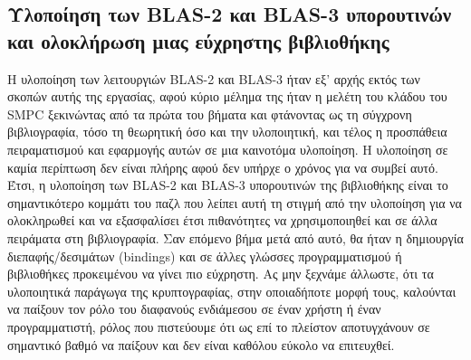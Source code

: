 \subsection{Υλοποίηση των BLAS-2 και BLAS-3 υπορουτινών και ολοκλήρωση μιας εύχρηστης βιβλιοθήκης}
Η υλοποίηση των λειτουργιών BLAS-2 και BLAS-3 ήταν εξ' αρχής εκτός των σκοπών αυτής της εργασίας, αφού κύριο μέλημα της ήταν η μελέτη του κλάδου του SMPC ξεκινώντας από τα πρώτα του βήματα και φτάνοντας ως τη σύγχρονη βιβλιογραφία, τόσο τη θεωρητική όσο και την υλοποιητική, και τέλος η προσπάθεια πειραματισμού και εφαρμογής αυτών σε μια καινοτόμα υλοποίηση. Η υλοποίηση σε καμία περίπτωση δεν είναι πλήρης αφού δεν υπήρχε ο χρόνος για να συμβεί αυτό. Έτσι, η υλοποίηση των BLAS-2 και BLAS-3 υπορουτινών της βιβλιοθήκης είναι το σημαντικότερο κομμάτι του παζλ που λείπει αυτή τη στιγμή από την υλοποίηση για να ολοκληρωθεί και να εξασφαλίσει έτσι πιθανότητες να χρησιμοποιηθεί και σε άλλα πειράματα στη βιβλιογραφία. Σαν επόμενο βήμα μετά από αυτό, θα ήταν η δημιουργία διεπαφής/δεσιμάτων (bindings) και σε άλλες γλώσσες προγραμματισμού ή βιβλιοθήκες προκειμένου να γίνει πιο εύχρηστη. Ας μην ξεχνάμε άλλωστε, ότι τα υλοποιητικά παράγωγα της κρυπτογραφίας, στην οποιαδήποτε μορφή τους, καλούνται να παίξουν τον ρόλο του διαφανούς ενδιάμεσου σε έναν χρήστη ή έναν προγραμματιστή, ρόλος που πιστεύουμε ότι ως επί το πλείστον αποτυγχάνουν σε σημαντικό βαθμό να παίξουν και δεν είναι καθόλου εύκολο να επιτευχθεί.

